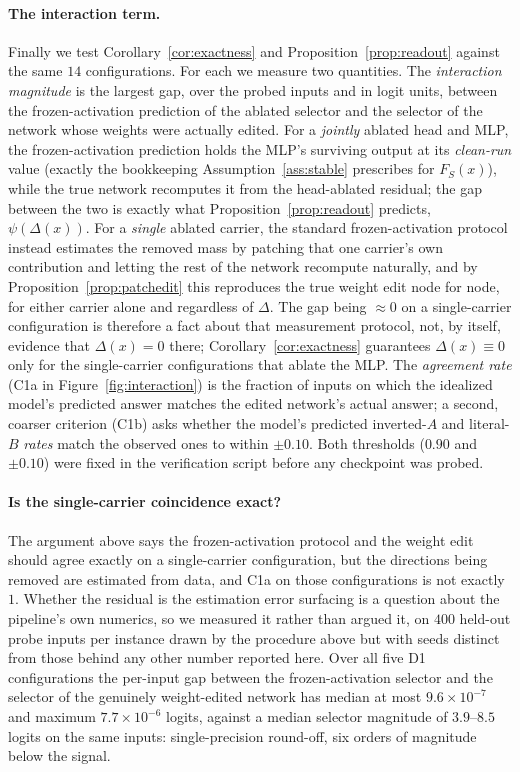 \documentclass[11pt,a4paper]{article}
\begin{document}
\paragraph{The interaction term.} Finally we test Corollary~\ref{cor:exactness}
and Proposition~\ref{prop:readout} against the same $14$ configurations. For
each we measure two quantities. The \emph{interaction magnitude} is the
largest gap, over the probed inputs and in logit units, between the
frozen-activation prediction of the ablated selector and the selector of the
network whose weights were actually edited. For a \emph{jointly} ablated
head and MLP, the frozen-activation prediction holds the MLP's surviving
output at its \emph{clean-run} value (exactly the bookkeeping
Assumption~\ref{ass:stable} prescribes for $F_S(x)$), while the true
network recomputes it from the head-ablated residual; the gap between the
two is exactly what Proposition~\ref{prop:readout} predicts, $\psi(\Delta(x))$.
For a \emph{single} ablated carrier, the standard frozen-activation protocol
instead estimates the removed mass by patching that one carrier's own
contribution and letting the rest of the network recompute naturally, and
by Proposition~\ref{prop:patchedit} this reproduces the true weight edit node
for node, for either carrier alone and regardless of $\Delta$. The gap being
$\approx0$ on a single-carrier configuration is therefore a fact about that
measurement protocol, not, by itself, evidence that
$\Delta(x)=0$ there; Corollary~\ref{cor:exactness} guarantees
$\Delta(x)\equiv0$ only for the single-carrier configurations that ablate the
MLP. The \emph{agreement rate} (C1a in
Figure~\ref{fig:interaction}) is the fraction of inputs on which the idealized
model's predicted answer matches the edited network's actual answer; a second,
coarser criterion (C1b) asks whether the model's predicted inverted-$A$ and
literal-$B$ \emph{rates} match the observed ones to within $\pm0.10$. Both
thresholds ($0.90$ and $\pm0.10$) were fixed in the verification script before
any checkpoint was probed.

\paragraph{Is the single-carrier coincidence exact?} The argument above says
the frozen-activation protocol and the weight edit should agree exactly on a
single-carrier configuration, but the directions being removed are estimated
from data, and C1a on those configurations is not exactly $1$. Whether the
residual is the estimation error surfacing is a question about the pipeline's
own numerics, so we measured it rather than argued it, on $400$ held-out probe
inputs per instance drawn by the procedure above but with seeds distinct from
those behind any other number reported here. Over all five D1 configurations
the per-input gap between the frozen-activation selector and the selector of
the genuinely weight-edited network has median at most $9.6\times10^{-7}$ and
maximum $7.7\times10^{-6}$ logits, against a median selector magnitude of
$3.9$--$8.5$ logits on the same inputs: single-precision round-off, six orders
of magnitude below the signal.
\end{document}
